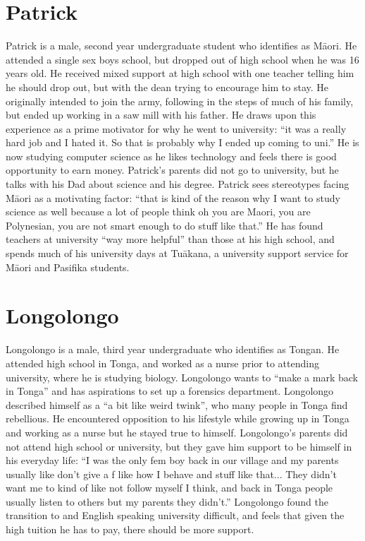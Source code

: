 \section{Patrick}
Patrick is a male, second year undergraduate student who identifies as M\={a}ori. He attended a single sex boys school, but dropped out of high school when he was 16 years old. He received mixed support at high school with one teacher telling him he should drop out, but with the dean trying to encourage him to stay. He originally intended to join the army, following in the steps of much of his family, but ended up working in a saw mill with his father. He draws upon this experience as a prime motivator for why he went to university: ``it was a really hard job and I hated it. So that is probably why I ended up coming to uni.'' He is now studying computer science as he likes technology and feels there is good opportunity to earn money. Patrick's parents did not go to university, but he talks with his Dad about science and his degree. Patrick sees stereotypes facing M\={a}ori as a motivating factor: ``that is kind of the reason why I want to study science as well because a lot of people think oh you are Maori, you are Polynesian, you are not smart enough to do stuff like that.'' He has found teachers at university ``way more helpful'' than those at his high school, and spends much of his university days at Tu\={a}kana, a university support service for M\={a}ori and Pasifika students.  

\section{Longolongo}
Longolongo  is a male, third year undergraduate who identifies as Tongan. He attended high school in Tonga, and worked as a nurse prior to attending university, where he is studying biology. Longolongo wants to ``make a mark back in Tonga'' and has aspirations to set up a forensics department. Longolongo described himself as a ``a bit like weird twink'', who many people in Tonga find rebellious. He encountered opposition to his lifestyle while growing up in Tonga and working as a nurse but he stayed true to himself. Longolongo's parents did not attend high school or university, but they gave him support to be himself in his everyday life: ``I was the only fem boy back in our village and my parents usually like don’t give a f like how I behave and stuff like that... They didn't want me to kind of like not follow myself I think, and back in Tonga people usually listen to others but my parents they didn't.'' Longolongo found the transition to and English speaking university difficult, and feels that given the high tuition he has to pay, there should be more support. 


